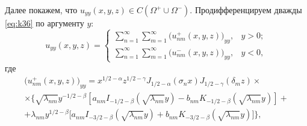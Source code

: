Далее покажем, что $u_{yy}(x,y,z)\in C(\Omega^+\cup\Omega^-).$ Продифференцируем дважды \eqref{eq:k36} по аргументу $y$:
\begin{equation}
u_{yy}(x,y,z) %
=\left\{ \begin{array}{ll}
\sum\limits_{n=1}^\infty\sum\limits_{m=1}^\infty
\bigl( u^+_{nm}(x,y,z)\bigr)_{yy} , &y > 0; 
\\[3mm]
\sum\limits_{n=1}^\infty 
\sum\limits_{m=1}^\infty 
\bigl( u^-_{nm}(x,y,z)\bigr)_{yy} , & y < 0,
 \end{array} \right. 
\label{eq:k63}
\end{equation}
где
\begin{multline*}
\bigl( u^+_{nm}(x,y,z)\bigr)_{yy}  =
x^{ 1/2 -\alpha}z^{ 1/2 -\gamma}J_{ 1/2 -\alpha}(\sigma_n x)J_{ 1/2 -\gamma}(\delta_m z)\times
\\
\times
\bigl\{\sqrt{\lambda_{nm}}y^{- 1/2 -\beta}[a_{nm}I_{- 1/2 -\beta}(\sqrt{\lambda_{nm}}y)-b_{nm}K_{- 1/2 -\beta}(\sqrt{\lambda_{nm}}y)]+ 
\\
+\lambda_{nm}y^{ 1/2 -\beta}\bigl[a_{nm}I_{-3/2-\beta}(\sqrt{\lambda_{nm}}y)
+b_{nm}K_{-3/2-\beta}(\sqrt{\lambda_{nm}}y)\bigr]\bigr\},
\end{multline*}
